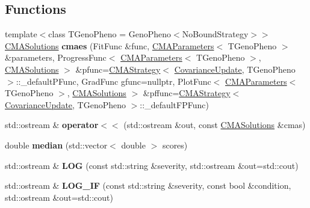 \subsection*{Functions}
\begin{DoxyCompactItemize}
\item 
\hypertarget{namespacelibcmaes_a6ea1009c6049caf18558816bdecac610}{{\footnotesize template$<$class T\-Geno\-Pheno  = Geno\-Pheno$<$\-No\-Bound\-Strategy$>$$>$ }\\\hyperlink{classlibcmaes_1_1CMASolutions}{C\-M\-A\-Solutions} {\bfseries cmaes} (Fit\-Func \&func, \hyperlink{classlibcmaes_1_1CMAParameters}{C\-M\-A\-Parameters}$<$ T\-Geno\-Pheno $>$ \&parameters, Progress\-Func$<$ \hyperlink{classlibcmaes_1_1CMAParameters}{C\-M\-A\-Parameters}$<$ T\-Geno\-Pheno $>$, \hyperlink{classlibcmaes_1_1CMASolutions}{C\-M\-A\-Solutions} $>$ \&pfunc=\hyperlink{classlibcmaes_1_1CMAStrategy}{C\-M\-A\-Strategy}$<$ \hyperlink{classlibcmaes_1_1CovarianceUpdate}{Covariance\-Update}, T\-Geno\-Pheno $>$\-::\-\_\-default\-P\-Func, Grad\-Func gfunc=nullptr, Plot\-Func$<$ \hyperlink{classlibcmaes_1_1CMAParameters}{C\-M\-A\-Parameters}$<$ T\-Geno\-Pheno $>$, \hyperlink{classlibcmaes_1_1CMASolutions}{C\-M\-A\-Solutions} $>$ \&pffunc=\hyperlink{classlibcmaes_1_1CMAStrategy}{C\-M\-A\-Strategy}$<$ \hyperlink{classlibcmaes_1_1CovarianceUpdate}{Covariance\-Update}, T\-Geno\-Pheno $>$\-::\-\_\-default\-F\-P\-Func)}\label{namespacelibcmaes_a6ea1009c6049caf18558816bdecac610}

\item 
\hypertarget{namespacelibcmaes_a1922020e8d2259dd870ccd7893c3ea24}{std\-::ostream \& {\bfseries operator$<$$<$} (std\-::ostream \&out, const \hyperlink{classlibcmaes_1_1CMASolutions}{C\-M\-A\-Solutions} \&cmas)}\label{namespacelibcmaes_a1922020e8d2259dd870ccd7893c3ea24}

\item 
\hypertarget{namespacelibcmaes_a5b344b982de59b91af2f0c317f234f17}{double {\bfseries median} (std\-::vector$<$ double $>$ scores)}\label{namespacelibcmaes_a5b344b982de59b91af2f0c317f234f17}

\item 
\hypertarget{namespacelibcmaes_a16d45e47c7b936252e380cfbe6809c99}{std\-::ostream \& {\bfseries L\-O\-G} (const std\-::string \&severity, std\-::ostream \&out=std\-::cout)}\label{namespacelibcmaes_a16d45e47c7b936252e380cfbe6809c99}

\item 
\hypertarget{namespacelibcmaes_a3209b3dbcdada9d81d357dedf066b975}{std\-::ostream \& {\bfseries L\-O\-G\-\_\-\-I\-F} (const std\-::string \&severity, const bool \&condition, std\-::ostream \&out=std\-::cout)}\label{namespacelibcmaes_a3209b3dbcdada9d81d357dedf066b975}

\end{DoxyCompactItemize}


